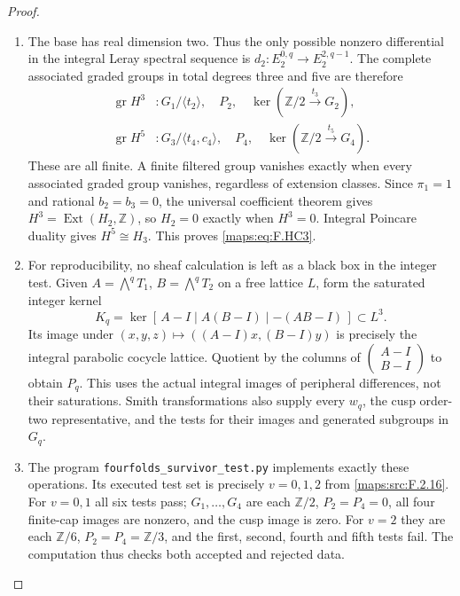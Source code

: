 \documentclass[11pt,a4paper]{article}
\theoremstyle{definition}
\begin{document}
\begin{proof}
\begin{enumerate}[label=\arabic*.]
\item The base has real dimension two.
Thus the only possible nonzero differential in the
integral Leray spectral sequence is
$d_2:E_2^{0,q}\to E_2^{2,q-1}$.
The complete associated graded groups in total
degrees three and five are therefore
\[
\begin{split}
 \operatorname{gr}H^3&:
   G_1/\langle t_2\rangle,\quad P_2,\quad
   \ker(\mathbb Z/2\xrightarrow{\,t_3\,}G_2),\\
 \operatorname{gr}H^5&:
   G_3/\langle t_4,c_4\rangle,\quad P_4,\quad
   \ker(\mathbb Z/2\xrightarrow{\,t_5\,}G_4).
\end{split}
\tag{F.HC10}\label{maps:eq:F.HC10}
\]
These are all finite.  A finite filtered group
vanishes exactly when every associated graded group
vanishes, regardless of extension classes.
Since $\pi_1=1$ and rational $b_2=b_3=0$, the universal
coefficient theorem gives
$H^3=\operatorname{Ext}(H_2,\mathbb Z)$, so
$H_2=0$ exactly when $H^3=0$.
Integral Poincare duality gives $H^5\cong H_3$.
This proves \eqref{maps:eq:F.HC3}.

\item For reproducibility, no sheaf calculation is left
as a black box in the integer test.
Given $A=\bigwedge^qT_1$, $B=\bigwedge^qT_2$ on a
free lattice $L$, form the saturated integer kernel
\[
 K_q=\ker[\,A-I\mid A(B-I)\mid -(AB-I)\,]\subset L^3.
 \tag{F.HC11}\label{maps:eq:F.HC11}
\]
Its image under
$(x,y,z)\mapsto((A-I)x,(B-I)y)$ is precisely the
integral parabolic cocycle lattice.
Quotient by the columns of
$\left(\begin{smallmatrix}A-I\\B-I\end{smallmatrix}\right)$
to obtain $P_q$.
This uses the actual integral images of peripheral
differences, not their saturations.
Smith transformations also supply every $w_q$, the
cusp order-two representative, and the tests for
their images and generated subgroups in $G_q$.

\item The program \texttt{fourfolds\_survivor\_test.py}
implements exactly these operations.
Its executed test set is precisely $v=0,1,2$ from
\ref{maps:src:F.2.16}.  For $v=0,1$ all six tests pass;
$G_1,\ldots,G_4$ are each $\mathbb Z/2$,
$P_2=P_4=0$, all four finite-cap images are nonzero,
and the cusp image is zero.
For $v=2$ they are each $\mathbb Z/6$,
$P_2=P_4=\mathbb Z/3$, and the first, second,
fourth and fifth tests fail.  The computation thus
checks both accepted and rejected data.


\end{enumerate}
\end{proof}
\end{document}
